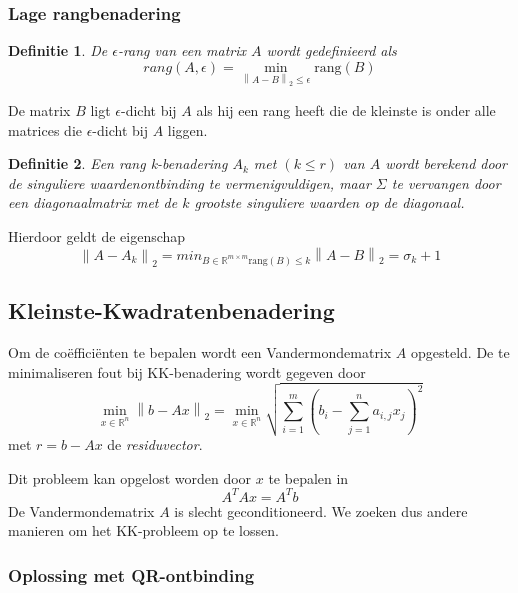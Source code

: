 \documentclass{article}
\newtheorem{mydef}{Definitie}
\newcommand{\norm}[1]{\left\lVert#1\right\rVert}
\begin{document}
	\subsubsection{Lage rangbenadering}
	
	\begin{mydef}
		De $\epsilon$-rang van een matrix $A$ wordt gedefinieerd als
		$$
			rang(A,\epsilon) = \min_{\norm{A-B}_2 \leq \epsilon} \text{rang}(B)
		$$
	\end{mydef}
	De matrix $B$ ligt $\epsilon$-dicht bij $A$ als hij een rang heeft die de kleinste is onder alle matrices die $\epsilon$-dicht bij $A$ liggen.
	
	\begin{mydef}
		Een rang k-benadering $A_k$ met $(k \leq r)$ van $A$ wordt berekend door de singuliere waardenontbinding te vermenigvuldigen, maar $\Sigma$ te vervangen door een diagonaalmatrix met de $k$ grootste singuliere waarden op de diagonaal.
	\end{mydef}

	Hierdoor geldt de eigenschap
	$$
		\norm{A-A_k}_2 = min_{B \in \mathbb{R}^{m \times m} \text{rang}(B) \leq k} \norm{A-B}_2 = \sigma_k+1
	$$
	
	
	\subsection{Kleinste-Kwadratenbenadering}
	Om de coëfficiënten te bepalen wordt een Vandermondematrix $A$ opgesteld. 
	De te minimaliseren fout bij KK-benadering wordt gegeven door
	$$
	\min_{x \in \mathbb{R}^n} \norm{b-Ax}_2 
	= \min_{x \in \mathbb{R}^n} \sqrt{\sum_{i=1}^{m}(b_i - \sum_{j=1}^{n}a_{i,j}x_j)^2}
	$$
	met $r=b-Ax$ de \textit{residuvector}.
	
	Dit probleem kan opgelost worden door $x$ te bepalen in 
	$$
	A^TAx = A^Tb
	$$
	De Vandermondematrix $A$ is slecht geconditioneerd. We zoeken dus andere manieren om het KK-probleem op te lossen.\\
	
	\subsubsection{Oplossing met QR-ontbinding}
	
\end{document}
